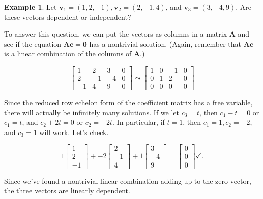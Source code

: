 \documentclass[
]{book}
\theoremstyle{definition}
\theoremstyle{definition}
\newtheorem{example}{Example}[chapter]
\theoremstyle{definition}
\theoremstyle{definition}
\theoremstyle{remark}
\begin{document}
\begin{examplebox}

\begin{example}
\protect\hypertarget{exm:ldepex1}{}\label{exm:ldepex1}Let \(\mathbf{v}_1=(1,2,-1),\mathbf{v}_2=(2,-1,4)\), and \(\mathbf{v}_3=(3,-4,9)\). Are these vectors dependent or independent?

To answer this question, we can put the vectors as columns in a matrix \(\mathbf{A}\) and see if the equation \(\mathbf{A}\mathbf{c}=\mathbf{0}\) has a nontrivial solution. (Again, remember that \(\mathbf{A}\mathbf{c}\) is a linear combination of the columns of \(\mathbf{A}\).)

\[\left[\begin{array}{rrr|r}1 & 2 & 3 & 0\\2 & -1 & -4 & 0\\-1 & 4 & 9 & 0\end{array}\right]\leadsto
\left[\begin{array}{rrr|r} 1 & 0 & -1 & 0\\0 & 1 & 2 & 0\\0 & 0 & 0 & 0\end{array}\right]\]

Since the reduced row echelon form of the coefficient matrix has a free variable, there will actually be infinitely many solutions. If we let \(c_3=t\), then \(c_1-t=0\) or \(c_1=t\), and \(c_2+2t=0\) or \(c_2=-2t\). In particular, if \(t=1\), then \(c_1=1,c_2=-2,\) and \(c_3=1\) will work. Let's check.

\[1\begin{bmatrix}1\\2\\-1\end{bmatrix}+-2\begin{bmatrix}2\\-1\\4\end{bmatrix}+1\begin{bmatrix}3\\-4\\9\end{bmatrix}=\begin{bmatrix}0\\0\\0\end{bmatrix}\checkmark.\]

Since we've found a nontrivial linear combination adding up to the zero vector, the three vectors are linearly dependent.
\end{example}

\end{examplebox}
\end{document}
